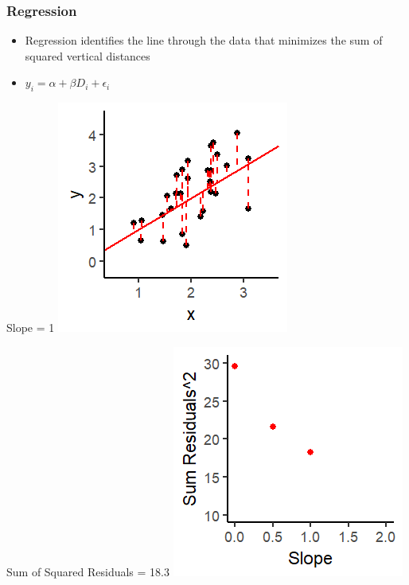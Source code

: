 \documentclass[xcolor=x11names,compress]{beamer}\usepackage[]{graphicx}\usepackage[]{color}
\makeatletter
\def\maxwidth{ %
  \ifdim\Gin@nat@width>\linewidth
    \linewidth
  \else
    \Gin@nat@width
  \fi
}
\newenvironment{knitrout}{}{} %
\renewcommand{\(}{\begin{columns}}
\renewcommand{\)}{\end{columns}}
\newcommand{\<}[1]{\begin{column}{#1}}
\renewcommand{\>}{\end{column}}
\makeatother
\begin{document}
\begin{frame}
\frametitle{Regression}
\begin{itemize}
\item Regression identifies the line through the data that minimizes the sum of squared vertical distances 
\item $y_i = \alpha + \beta D_i + \epsilon_i$
\end{itemize}
\begin{multicols}{2}
Slope = 1
\begin{knitrout}
\color{fgcolor}
\includegraphics[width=\maxwidth]{figure/graph_ols3-1} 

\end{knitrout}
\columnbreak
Sum of Squared Residuals = 18.3
\begin{knitrout}
\color{fgcolor}
\includegraphics[width=\maxwidth]{figure/graph_ssr3-1} 

\end{knitrout}
\end{multicols}
\end{frame}
\end{document}
